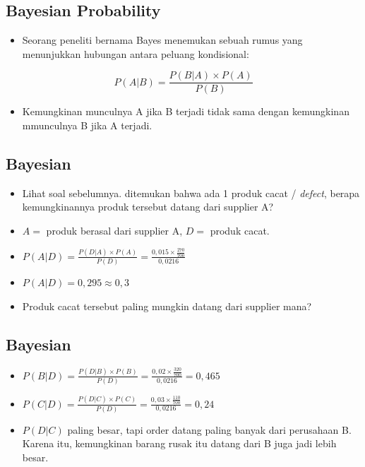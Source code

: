 \documentclass[
  letterpaper,
  DIV=11,
  numbers=noendperiod]{scrartcl}
\providecommand{\tightlist}{%
  \setlength{\itemsep}{0pt}\setlength{\parskip}{0pt}}\usepackage{longtable,booktabs,array}
\begin{document}
\hypertarget{bayesian-probability}{%
\subsection{Bayesian Probability}\label{bayesian-probability}}

\begin{itemize}
\tightlist
\item
  Seorang peneliti bernama Bayes menemukan sebuah rumus yang menunjukkan
  hubungan antara peluang kondisional:
\end{itemize}

\[
P(A|B)=\frac{P(B|A) \times P(A)}{P(B)}
\]

\begin{itemize}
\tightlist
\item
  Kemungkinan munculnya A jika B terjadi tidak sama dengan kemungkinan
  mmunculnya B jika A terjadi.
\end{itemize}

\hypertarget{bayesian}{%
\subsection{Bayesian}\label{bayesian}}

\begin{itemize}
\item
  Lihat soal sebelumnya. ditemukan bahwa ada 1 produk cacat /
  \emph{defect}, berapa kemungkinannya produk tersebut datang dari
  supplier A?
\item
  \(A=\) produk berasal dari supplier A, \(D=\) produk cacat.
\item
  \(P(A|D)=\frac{P(D|A) \times P(A)}{P(D)}=\frac{0,015 \times \frac{270}{700}}{0,0216}\)
\item
  \(P(A|D)=0,295 \approx 0,3\)
\item
  Produk cacat tersebut paling mungkin datang dari supplier mana?
\end{itemize}

\hypertarget{bayesian-1}{%
\subsection{Bayesian}\label{bayesian-1}}

\begin{itemize}
\item
  \(P(B|D)=\frac{P(D|B) \times P(B)}{P(D)}=\frac{0,02 \times \frac{320}{700}}{0,0216}=0,465\)
\item
  \(P(C|D)=\frac{P(D|C) \times P(C)}{P(D)}=\frac{0,03 \times \frac{110}{700}}{0,0216}=0,24\)
\item
  \(P(D|C)\) paling besar, tapi order datang paling banyak dari
  perusahaan B. Karena itu, kemungkinan barang rusak itu datang dari B
  juga jadi lebih besar.
\end{itemize}
\end{document}
